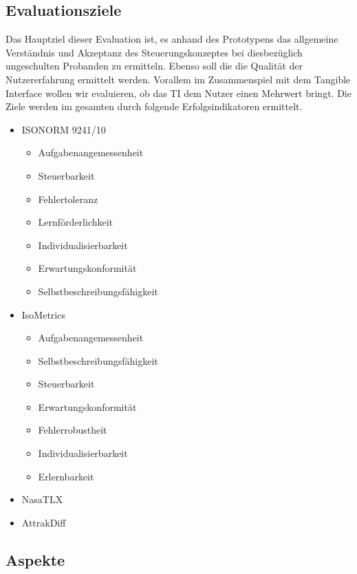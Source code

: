 \documentclass[runningheads,a4paper, 12pt]{llncs}
\begin{document}
\subsection{Evaluationsziele}
Das Hauptziel dieser Evaluation ist, es anhand des Prototypens das allgemeine Verständnis und Akzeptanz des Steuerungskonzeptes bei diesbezüglich ungeschulten Probanden zu ermitteln.
Ebenso soll die die Qualität der Nutzererfahrung ermittelt werden. Vorallem im Zusammenspiel mit dem Tangible Interface wollen wir evaluieren, ob das TI dem Nutzer einen Mehrwert bringt.
Die Ziele werden im gesamten durch folgende Erfolgsindikatoren ermittelt.
\begin{itemize}  
	\item ISONORM 9241/10
	 \begin{itemize}
	 	\item Aufgabenangemessenheit
	 	\item Steuerbarkeit
	 	\item Fehlertoleranz
	 	\item Lernförderlichkeit
	 	\item Individualisierbarkeit
	 	\item Erwartungskonformität
	 	\item Selbstbeschreibungsfähigkeit  
	 \end{itemize}
	\item IsoMetrics
	\begin{itemize}
		\item Aufgabenangemessenheit
		\item Selbstbeschreibungsfähigkeit
		\item Steuerbarkeit
		\item Erwartungskonformität
		\item Fehlerrobustheit
		\item Individualisierbarkeit
		\item Erlernbarkeit
	\end{itemize}
	\item NasaTLX 
	\item AttrakDiff 
\end{itemize}
\subsection{Aspekte}
\end{document}
